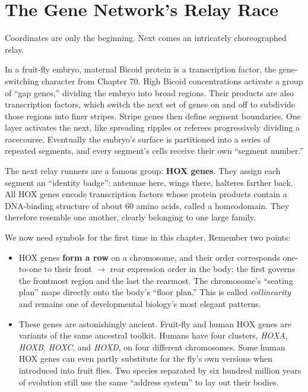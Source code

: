 \section{The Gene Network's Relay Race}

Coordinates are only the beginning. Next comes an intricately choreographed relay.

In a fruit-fly embryo, maternal Bicoid protein is a transcription factor, the gene-switching character from Chapter 70. High Bicoid concentrations activate a group of ``gap genes,'' dividing the embryo into broad regions. Their products are also transcription factors, which switch the next set of genes on and off to subdivide those regions into finer stripes. Stripe genes then define segment boundaries. One layer activates the next, like spreading ripples or referees progressively dividing a racecourse. Eventually the embryo's surface is partitioned into a series of repeated segments, and every segment's cells receive their own ``segment number.''

The next relay runners are a famous group: \textbf{HOX genes}. They assign each segment an ``identity badge'': antennae here, wings there, halteres farther back. All HOX genes encode transcription factors whose protein products contain a DNA-binding structure of about 60 amino acids, called a homeodomain. They therefore resemble one another, clearly belonging to one large family.

We now need symbols for the first time in this chapter. Remember two points:

\begin{itemize}[itemsep=2pt]
\item HOX genes \textbf{form a row} on a chromosome, and their order corresponds one-to-one to their front $\rightarrow$ rear expression order in the body: the first governs the frontmost region and the last the rearmost. The chromosome's ``seating plan'' maps directly onto the body's ``floor plan.'' This is called \emph{collinearity} and remains one of developmental biology's most elegant patterns.
\item These genes are astonishingly ancient. Fruit-fly and human HOX genes are variants of the same ancestral toolkit. Humans have four clusters, \textit{HOXA}, \textit{HOXB}, \textit{HOXC}, and \textit{HOXD}, on four different chromosomes. Some human HOX genes can even partly substitute for the fly's own versions when introduced into fruit flies. Two species separated by six hundred million years of evolution still use the same ``address system'' to lay out their bodies.
\end{itemize}

